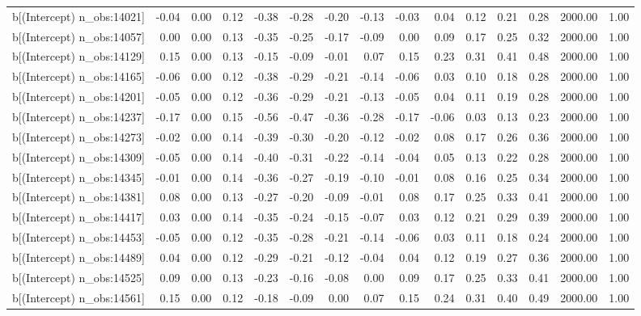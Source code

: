\begin{table}[ht]
\begin{tabular}{rrrrrrrrrrrrrrr}
  b[(Intercept) n\_obs:14021] & -0.04 & 0.00 & 0.12 & -0.38 & -0.28 & -0.20 & -0.13 & -0.03 & 0.04 & 0.12 & 0.21 & 0.28 & 2000.00 & 1.00 \\ 
  b[(Intercept) n\_obs:14057] & 0.00 & 0.00 & 0.13 & -0.35 & -0.25 & -0.17 & -0.09 & 0.00 & 0.09 & 0.17 & 0.25 & 0.32 & 2000.00 & 1.00 \\ 
  b[(Intercept) n\_obs:14129] & 0.15 & 0.00 & 0.13 & -0.15 & -0.09 & -0.01 & 0.07 & 0.15 & 0.23 & 0.31 & 0.41 & 0.48 & 2000.00 & 1.00 \\ 
  b[(Intercept) n\_obs:14165] & -0.06 & 0.00 & 0.12 & -0.38 & -0.29 & -0.21 & -0.14 & -0.06 & 0.03 & 0.10 & 0.18 & 0.28 & 2000.00 & 1.00 \\ 
  b[(Intercept) n\_obs:14201] & -0.05 & 0.00 & 0.12 & -0.36 & -0.29 & -0.21 & -0.13 & -0.05 & 0.04 & 0.11 & 0.19 & 0.28 & 2000.00 & 1.00 \\ 
  b[(Intercept) n\_obs:14237] & -0.17 & 0.00 & 0.15 & -0.56 & -0.47 & -0.36 & -0.28 & -0.17 & -0.06 & 0.03 & 0.13 & 0.23 & 2000.00 & 1.00 \\ 
  b[(Intercept) n\_obs:14273] & -0.02 & 0.00 & 0.14 & -0.39 & -0.30 & -0.20 & -0.12 & -0.02 & 0.08 & 0.17 & 0.26 & 0.36 & 2000.00 & 1.00 \\ 
  b[(Intercept) n\_obs:14309] & -0.05 & 0.00 & 0.14 & -0.40 & -0.31 & -0.22 & -0.14 & -0.04 & 0.05 & 0.13 & 0.22 & 0.28 & 2000.00 & 1.00 \\ 
  b[(Intercept) n\_obs:14345] & -0.01 & 0.00 & 0.14 & -0.36 & -0.27 & -0.19 & -0.10 & -0.01 & 0.08 & 0.16 & 0.25 & 0.34 & 2000.00 & 1.00 \\ 
  b[(Intercept) n\_obs:14381] & 0.08 & 0.00 & 0.13 & -0.27 & -0.20 & -0.09 & -0.01 & 0.08 & 0.17 & 0.25 & 0.33 & 0.41 & 2000.00 & 1.00 \\ 
  b[(Intercept) n\_obs:14417] & 0.03 & 0.00 & 0.14 & -0.35 & -0.24 & -0.15 & -0.07 & 0.03 & 0.12 & 0.21 & 0.29 & 0.39 & 2000.00 & 1.00 \\ 
  b[(Intercept) n\_obs:14453] & -0.05 & 0.00 & 0.12 & -0.35 & -0.28 & -0.21 & -0.14 & -0.06 & 0.03 & 0.11 & 0.18 & 0.24 & 2000.00 & 1.00 \\ 
  b[(Intercept) n\_obs:14489] & 0.04 & 0.00 & 0.12 & -0.29 & -0.21 & -0.12 & -0.04 & 0.04 & 0.12 & 0.19 & 0.27 & 0.36 & 2000.00 & 1.00 \\ 
  b[(Intercept) n\_obs:14525] & 0.09 & 0.00 & 0.13 & -0.23 & -0.16 & -0.08 & 0.00 & 0.09 & 0.17 & 0.25 & 0.33 & 0.41 & 2000.00 & 1.00 \\ 
  b[(Intercept) n\_obs:14561] & 0.15 & 0.00 & 0.12 & -0.18 & -0.09 & 0.00 & 0.07 & 0.15 & 0.24 & 0.31 & 0.40 & 0.49 & 2000.00 & 1.00 \\ 

\end{tabular}
\end{table}
